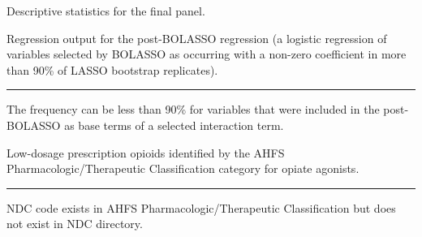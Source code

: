 \documentclass[9pt,twoside]{pnas-new}
\begin{document}
\footnotesize

\normalsize

\begin{table}
\caption{Descriptive statistics for the final panel.}
\centering

\end{table}

\begin{table}
\caption{Regression output for the post-BOLASSO regression (a logistic regression of variables selected by BOLASSO as occurring with a non-zero coefficient in more than 90\% of LASSO bootstrap replicates).}
\centering
\small

\hrule
\begin{tablenotes}
\footnotesize
\item * The frequency can be less than 90\% for variables that were included in the post-BOLASSO as base terms of a selected interaction term.
\end{tablenotes}
\end{table}

\begin{table}
\caption{Low-dosage prescription opioids identified by the AHFS Pharmacologic/Therapeutic Classification category for opiate agonists.}
\centering
\footnotesize

\hrule
\begin{tablenotes}
\footnotesize
\item * NDC code exists in AHFS Pharmacologic/Therapeutic Classification but does not exist in NDC directory.
\end{tablenotes}
\end{table}
\end{document}

